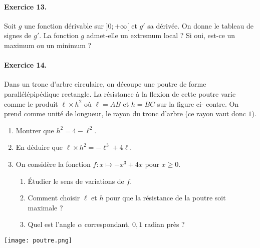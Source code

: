 \documentclass[11pt]{article}
\begin{document}
\paragraph{Exercice 13.}
Soit $g$ une fonction dérivable sur $]0;+\infty[$ et $g'$ sa dérivée. On donne le
tableau de signes de $g'$. La fonction $g$ admet-elle un extremum local ? Si
oui, est-ce un maximum ou un minimum ?
\begin{center}
\end{center}

\paragraph{Exercice 14.}
Dans un tronc d’arbre circulaire, on découpe une poutre de forme parallélépipédique rectangle.
La résistance à la flexion de cette poutre varie comme le produit $\ell\times
h^2$ où $\ell =AB$ et $h = BC$ sur la figure ci-
contre. On prend comme unité de longueur, le rayon du tronc d’arbre (ce rayon
vaut donc $1$).\\
\begin{minipage}{.6\textwidth}
  \begin{enumerate}
    \item Montrer que $h^2=4-\ell^2$.
    \item En déduire que $\ell\times h^2=-\ell^3+4\ell$.
    \item On considère la fonction $f:x\mapsto -x^3+4x$ pour $x\geq0$.
      \begin{enumerate}
        \item Étudier le sens de variations de $f$.
        \item Comment choisir $\ell$ et $h$ pour que la résistance de la poutre
          soit maximale ?
        \item Quel est l'angle $\alpha$ correspondant, $0,1$ radian près ?
      \end{enumerate}
  \end{enumerate}
\end{minipage}
\begin{minipage}{.4\textwidth}
  \begin{center}
    \texttt{[image: poutre.png]}
  \end{center}
\end{minipage}
\end{document}
